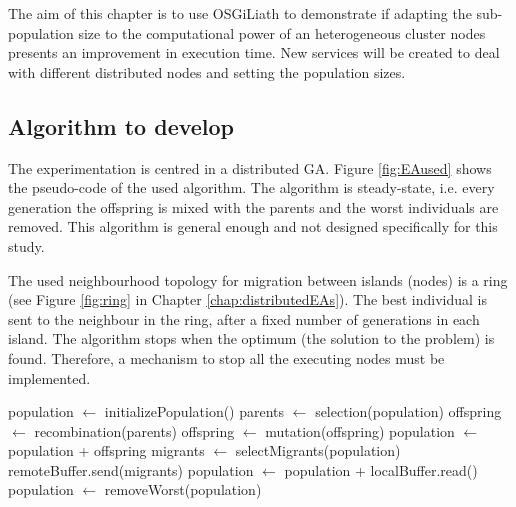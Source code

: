 The aim of this chapter is to use OSGiLiath to demonstrate if adapting the sub-population size to the computational power of an heterogeneous cluster nodes presents an improvement in execution time. New services will be created to deal with different distributed nodes and setting the population sizes.




\subsection{Algorithm to develop}

The experimentation is centred in a distributed GA. Figure \ref{fig:EAused} shows the pseudo-code of the used algorithm. 
The algorithm is steady-state, i.e. every generation the offspring is
mixed with the parents and the worst individuals are removed. This algorithm is general enough and not designed specifically for this study.

 The used neighbourhood topology for migration between islands (nodes)
 is a ring (see Figure \ref{fig:ring} in Chapter
 \ref{chap:distributedEAs}). The best individual is sent to the
 neighbour in the ring, after a fixed number of generations in each
 island. The algorithm stops when the optimum (the solution to the
 problem) is found.   %
Therefore, a mechanism to stop all the executing nodes must be implemented.

\newsavebox{\algoadaptativebox}
\begin{lrbox}{\algoadaptativebox}
\begin{minipage}{10cm}
\begin{algorithmic} %
\STATE population $\gets$ initializePopulation()
    \STATE parents $\gets$ selection(population)
    \STATE offspring $\gets$ recombination(parents)
    \STATE offspring $\gets$ mutation(offspring)
    \STATE population $\gets$ population + offspring
      \STATE migrants $\gets$ selectMigrants(population)
      \STATE remoteBuffer.send(migrants) %
    \ENDIF
      \STATE population $\gets$ population + localBuffer.read()
    \ENDIF
    \STATE population $\gets$ removeWorst(population)
\ENDWHILE
\end{algorithmic}
\end{minipage}
\end{lrbox}

